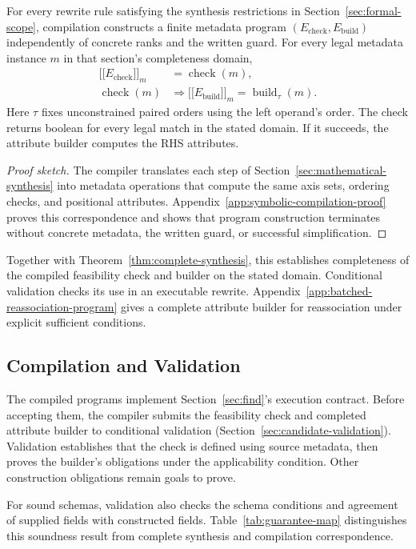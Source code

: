 \begin{theorem}
\label{thm:symbolic-compilation}
For every rewrite rule satisfying the synthesis restrictions in
Section~\ref{sec:formal-scope}, compilation
constructs a finite metadata program $(E_{\mathrm{check}},E_{\mathrm{build}})$ independently of concrete
ranks and the written guard. For every legal metadata instance $m$ in that
section's completeness domain,
\begin{align}
 \lbrack\!\lbrack E_{\mathrm{check}}\rbrack\!\rbrack_m&=\operatorname{check}(m),
 \label{eq:emitted-check}\\
 \operatorname{check}(m)&\Rightarrow
 \lbrack\!\lbrack E_{\mathrm{build}}\rbrack\!\rbrack_m=\operatorname{build}_{\tau}(m).
 \label{eq:emitted-build}
\end{align}
Here $\tau$ fixes unconstrained paired orders using the left operand's
order. The check returns boolean for every legal match in the stated domain.
If it succeeds, the attribute builder computes the RHS attributes.
\end{theorem}
\begin{proof}[Proof sketch]
The compiler translates each step of Section~\ref{sec:mathematical-synthesis}
into metadata operations that compute the same axis sets, ordering checks,
and positional attributes. Appendix~\ref{app:symbolic-compilation-proof}
proves this correspondence and shows that program construction terminates
without concrete metadata, the written guard, or successful simplification.
\end{proof}

Together with Theorem~\ref{thm:complete-synthesis}, this establishes
completeness of the compiled feasibility check and builder on the stated
domain. Conditional validation checks its use in an executable rewrite.
Appendix~\ref{app:batched-reassociation-program} gives a complete attribute
builder for reassociation under explicit sufficient conditions.

\subsection{Compilation and Validation}
\label{sec:compilation-scope}
The compiled programs implement Section~\ref{sec:find}'s execution
contract. Before accepting them, the compiler submits the feasibility
check and completed attribute builder to conditional validation
(Section~\ref{sec:candidate-validation}). Validation establishes that the
check is defined using source metadata, then proves the builder's
obligations under the applicability condition. Other construction
obligations remain goals to prove.

For sound schemas, validation also checks the schema conditions and
agreement of supplied fields with constructed fields. Table~\ref{tab:guarantee-map}
distinguishes this soundness result from complete synthesis and compilation
correspondence.
